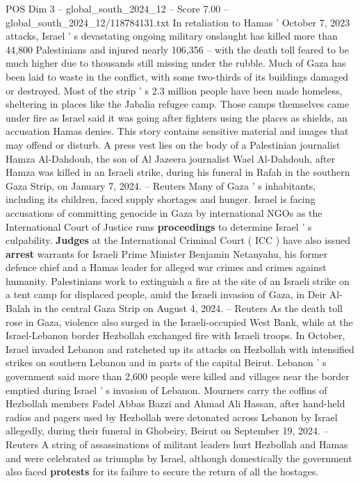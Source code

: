 \begin{textsample}{POS Dim 3 – global\_south\_2024\_12 – Score 7.00 – global\_south\_2024\_12/118784131.txt}  \label{ex:f3_pos_391}
In retaliation to Hamas ' October 7, 2023 attacks, Israel ' s devastating ongoing military onslaught has killed more than 44,800 Palestinians and injured nearly 106,356 -- with the death toll feared to be much higher due to thousands still missing under the rubble.
Much of Gaza has been laid to waste in the conflict, with some two-thirds of its buildings damaged or destroyed.
Most of the strip ' s 2.3 million people have been made homeless, sheltering in places like the Jabalia refugee camp.
Those camps themselves came under fire as Israel said it was going after fighters using the places as shields, an accusation Hamas denies.
This story contains sensitive material and images that may offend or disturb.
A press vest lies on the body of a Palestinian journalist Hamza Al-Dahdouh, the son of Al Jazeera journalist Wael Al-Dahdouh, after Hamza was killed in an Israeli strike, during his funeral in Rafah in the southern Gaza Strip, on January 7, 2024. -- Reuters Many of Gaza ' s inhabitants, including its children, faced supply shortages and hunger.
Israel is facing accusations of committing genocide in Gaza by international NGOs as the International Court of Justice runs \textbf{proceedings} to determine Israel ' s culpability. \textbf{Judges} at the International Criminal Court ( ICC ) have also issued \textbf{arrest} warrants for Israeli Prime Minister Benjamin Netanyahu, his former defence chief and a Hamas leader for alleged war crimes and crimes against humanity.
Palestinians work to extinguish a fire at the site of an Israeli strike on a tent camp for displaced people, amid the Israeli invasion of Gaza, in Deir Al-Balah in the central Gaza Strip on August 4, 2024. -- Reuters As the death toll rose in Gaza, violence also surged in the Israeli-occupied West Bank, while at the Israel-Lebanon border Hezbollah exchanged fire with Israeli troops.
In October, Israel invaded Lebanon and ratcheted up its attacks on Hezbollah with intensified strikes on southern Lebanon and in parts of the capital Beirut.
Lebanon ' s government said more than 2,600 people were killed and villages near the border emptied during Israel ' s invasion of Lebanon.
Mourners carry the coffins of Hezbollah members Fadel Abbas Bazzi and Ahmad Ali Hassan, after hand-held radios and pagers used by Hezbollah were detonated across Lebanon by Israel allegedly, during their funeral in Ghobeiry, Beirut on September 19, 2024. -- Reuters A string of assassinations of militant leaders hurt Hezbollah and Hamas and were celebrated as triumphs by Israel, although domestically the government also faced \textbf{protests} for its failure to secure the return of all the hostages.

\end{textsample}
